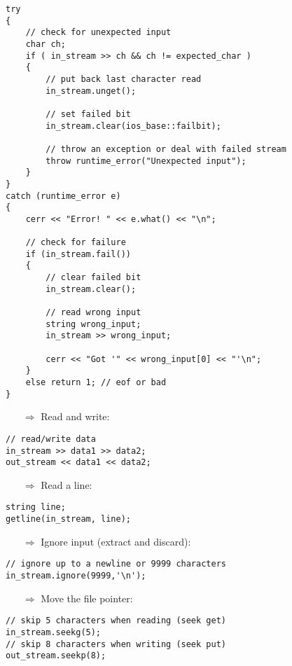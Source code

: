 \documentclass[10pt]{article}
\begin{document}
\begin{lstlisting}
try
{
    // check for unexpected input
    char ch;
    if ( in_stream >> ch && ch != expected_char )
    {
        // put back last character read
        in_stream.unget();
        
        // set failed bit
        in_stream.clear(ios_base::failbit);
    
        // throw an exception or deal with failed stream
        throw runtime_error("Unexpected input");
    }
}
catch (runtime_error e)
{
    cerr << "Error! " << e.what() << "\n";
            
    // check for failure
    if (in_stream.fail())
    {
        // clear failed bit
        in_stream.clear();
                
        // read wrong input
        string wrong_input;
        in_stream >> wrong_input;
                    
        cerr << "Got '" << wrong_input[0] << "'\n";
    }
    else return 1; // eof or bad
}
\end{lstlisting}
\begin{enumerate}
\item[$\Rightarrow$] Read and write:
\end{enumerate}
\begin{lstlisting}
// read/write data
in_stream >> data1 >> data2;
out_stream << data1 << data2;
\end{lstlisting}
\begin{enumerate}
\item[$\Rightarrow$] Read a line:
\end{enumerate}
\begin{lstlisting}
string line;
getline(in_stream, line);
\end{lstlisting}
\begin{enumerate}
\item[$\Rightarrow$] Ignore input (extract and discard):
\end{enumerate}
\begin{lstlisting}
// ignore up to a newline or 9999 characters
in_stream.ignore(9999,'\n');
\end{lstlisting}
\begin{enumerate}
\item[$\Rightarrow$] Move the file pointer:
\end{enumerate}
\begin{lstlisting}
// skip 5 characters when reading (seek get)
in_stream.seekg(5);
// skip 8 characters when writing (seek put)
out_stream.seekp(8);
\end{lstlisting}
\end{document}
